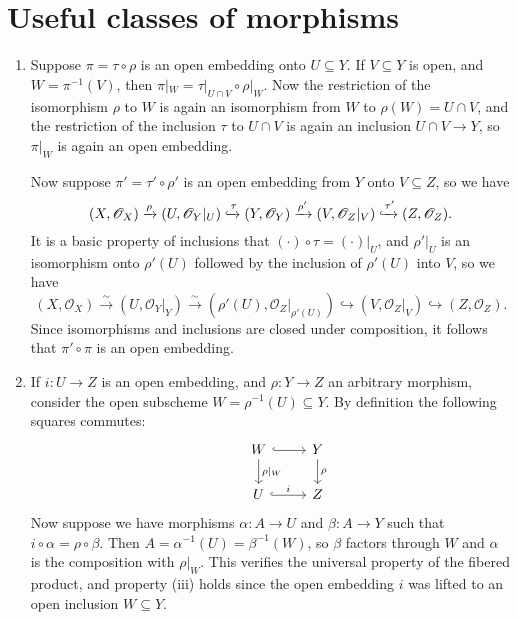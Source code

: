 \documentclass{report}
\renewcommand{\O}{\mathscr{O}} %
\begin{document}
\chapter{Useful classes of morphisms}

\begin{enumerate}[label=\textbf{7.1.\Alph*.}]
	\item Suppose $\pi=\tau\circ\rho$ is an open embedding onto $U\subseteq Y$.
	      If $V\subseteq Y$ is open, and $W=\pi^{-1}(V)$, then
	      $\pi|_W=\tau|_{U\cap V}\circ\rho|_W$. Now the restriction of the
	      isomorphism $\rho$ to $W$ is again an isomorphism from $W$ to
	      $\rho(W)=U\cap V$, and the restriction of the inclusion $\tau$ to
	      $U\cap V$ is again an inclusion $U\cap V\to Y$, so $\pi|_W$ is again an
	      open embedding.

	      Now suppose $\pi'=\tau'\circ\rho'$ is an open embedding from $Y$ onto
	      $V\subseteq Z$, so we have
	      \begin{equation*}
		      (X,\O_X)
		      \xrightarrow{\rho} (U,\O_Y|_U)
		      \xhookrightarrow{\tau} (Y,\O_Y)
		      \xrightarrow{\rho'} (V,\O_Z|_V)
		      \xhookrightarrow{\tau'} (Z,\O_Z).
	      \end{equation*}
	      It is a basic property of inclusions that $(\cdot)\circ\tau=(\cdot)|_U$,
	      and $\rho'|_U$ is an isomorphism onto $\rho'(U)$ followed by the
	      inclusion of $\rho'(U)$ into $V$, so we have
	      \begin{equation*}
		      (X,\O_X)
		      \xrightarrow\sim (U,\O_Y|_Y)
		      \xrightarrow\sim (\rho'(U),\O_Z|_{\rho'(U)})
		      \hookrightarrow (V,\O_Z|_V)
		      \hookrightarrow (Z,\O_Z).
	      \end{equation*}
	      Since isomorphisms and inclusions are closed under composition, it
	      follows that $\pi'\circ\pi$ is an open embedding.

	\item If $i:U\to Z$ is an open embedding, and $\rho:Y\to Z$ an arbitrary
	      morphism, consider the open subscheme $W=\rho^{-1}(U)\subseteq Y$.
	      By definition the following squares commutes:
	      \begin{equation*}
		      \begin{tikzcd}
			      &W \ar[r,hook] \ar[d,"\rho|_W"] &Y \ar[d,"\rho"] \\
			      &U \ar[r,hook,"i"] &Z
		      \end{tikzcd}
	      \end{equation*}
	      Now suppose we have morphisms $\alpha:A\to U$ and $\beta:A\to Y$ such
	      that $i\circ\alpha=\rho\circ\beta$. Then
	      $A=\alpha^{-1}(U)=\beta^{-1}(W)$, so $\beta$ factors through $W$ and
	      $\alpha$ is the composition with $\rho|_W$. This verifies the universal
	      property of the fibered product, and property (iii) holds since the open
	      embedding $i$ was lifted to an open inclusion $W\subseteq Y$.


\end{enumerate}
\end{document}
